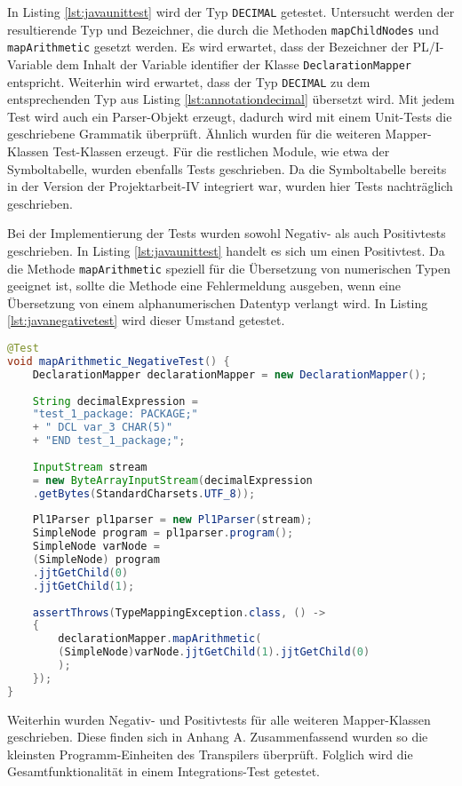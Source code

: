 In Listing \ref{lst:javaunittest}  wird der Typ \verb+DECIMAL+ getestet. Untersucht werden der resultierende Typ und Bezeichner, die durch die Methoden \verb+mapChildNodes+ und \verb+mapArithmetic+ gesetzt werden. Es wird erwartet, dass der Bezeichner der PL/I-Variable dem Inhalt der Variable identifier der Klasse \verb+DeclarationMapper+ entspricht.
Weiterhin wird erwartet, dass der Typ \verb+DECIMAL+ zu dem entsprechenden Typ aus Listing \ref{lst:annotationdecimal} übersetzt wird.
Mit jedem Test wird auch ein Parser-Objekt erzeugt, dadurch wird  mit einem Unit-Tests die geschriebene Grammatik überprüft.
Ähnlich wurden  für die weiteren Mapper-Klassen Test-Klassen erzeugt.
Für die restlichen Module, wie etwa der Symboltabelle, wurden ebenfalls Tests geschrieben.
Da die Symboltabelle bereits in der Version der Projektarbeit-IV integriert war, wurden hier  Tests nachträglich geschrieben. 

Bei der Implementierung der Tests wurden sowohl Negativ- als auch Positivtests geschrieben.
In Listing \ref{lst:javaunittest} handelt es sich um einen Positivtest. Da die Methode \verb+mapArithmetic+ speziell für die Übersetzung von numerischen Typen geeignet ist, sollte die Methode eine Fehlermeldung ausgeben, wenn eine Übersetzung von einem alphanumerischen Datentyp verlangt wird.  In Listing \ref{lst:javanegativetest} wird dieser Umstand getestet. 

\begin{lstlisting}[language=Java, caption=Negativtest für die Übersetzung eines arithmetischen Ausdrucks, label={lst:javanegativetest}]
@Test
void mapArithmetic_NegativeTest() {
	DeclarationMapper declarationMapper = new DeclarationMapper();
	
	String decimalExpression = 
	"test_1_package: PACKAGE;" 
	+ "	DCL var_3 CHAR(5)" 
	+ "END test_1_package;";
	
	InputStream stream
	= new ByteArrayInputStream(decimalExpression
	.getBytes(StandardCharsets.UTF_8));
		
	Pl1Parser pl1parser = new Pl1Parser(stream);
	SimpleNode program = pl1parser.program();
	SimpleNode varNode = 
	(SimpleNode) program
	.jjtGetChild(0)
	.jjtGetChild(1);
		
	assertThrows(TypeMappingException.class, () -> 
	{
		declarationMapper.mapArithmetic(
		(SimpleNode)varNode.jjtGetChild(1).jjtGetChild(0)
		);
	});
}
\end{lstlisting}

Weiterhin wurden Negativ- und Positivtests für alle weiteren Mapper-Klassen geschrieben. Diese finden sich in Anhang A.
Zusammenfassend wurden so die kleinsten Programm-Einheiten des Transpilers überprüft. 
Folglich wird die Gesamtfunktionalität in einem Integrations-Test getestet.

